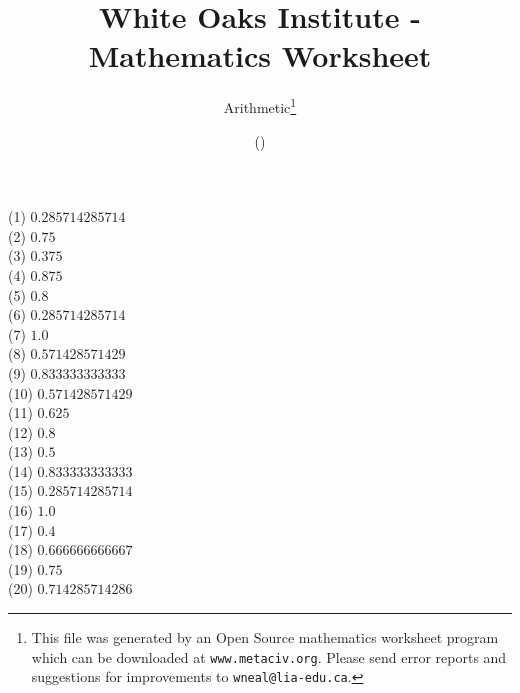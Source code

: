 \documentclass[letter]{article}
\begin{document}
\title{White Oaks Institute - Mathematics Worksheet}
\author{Arithmetic\thanks{This file was generated by an \textsf{Open Source} mathematics worksheet program which can be downloaded at \texttt{www.metaciv.org}. Please send error reports and suggestions for improvements to \texttt{wneal@lia-edu.ca}.}}
\date{\XCfileversion{} (\XCfiledate)}
\maketitle
\setlength{\parskip}{12mm plus 4mm minus 4mm}\setlength{\parindent}{0cm}\begin{multicols}{2}(1) $0.285714285714$\\(2) $0.75$\\(3) $0.375$\\(4) $0.875$\\(5) $0.8$\\(6) $0.285714285714$\\(7) $1.0$\\(8) $0.571428571429$\\(9) $0.833333333333$\\(10) $0.571428571429$\\(11) $0.625$\\(12) $0.8$\\(13) $0.5$\\(14) $0.833333333333$\\(15) $0.285714285714$\\(16) $1.0$\\(17) $0.4$\\(18) $0.666666666667$\\(19) $0.75$\\(20) $0.714285714286$\\\end{multicols}
\end{document}
